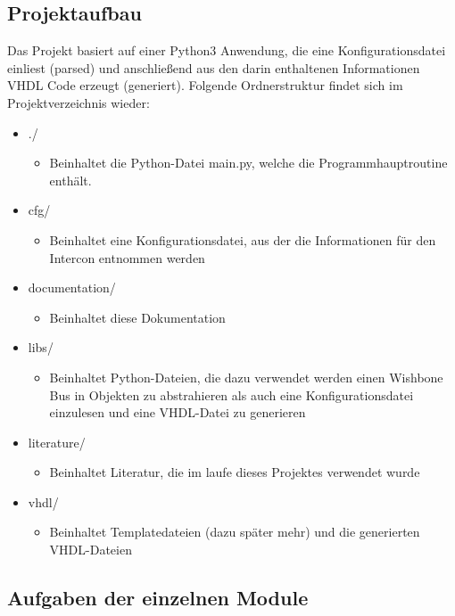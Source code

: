 \documentclass{article}
\begin{document}
\subsection{Projektaufbau}
Das Projekt basiert auf einer Python3 Anwendung, die eine Konfigurationsdatei einliest (parsed) und anschließend aus den darin enthaltenen Informationen VHDL Code erzeugt (generiert).
Folgende Ordnerstruktur findet sich im Projektverzeichnis wieder:
\begin{itemize}
\item ./
\begin{itemize}
\item Beinhaltet die Python-Datei main.py, welche die Programmhauptroutine enthält.
\end{itemize}
\item cfg/
\begin{itemize}
\item Beinhaltet eine Konfigurationsdatei, aus der die Informationen für den Intercon entnommen werden
\end{itemize}
\item documentation/
\begin{itemize}
\item Beinhaltet diese Dokumentation
\end{itemize}
\item libs/
\begin{itemize}
\item Beinhaltet Python-Dateien, die dazu verwendet werden einen Wishbone Bus in Objekten zu abstrahieren als auch eine Konfigurationsdatei einzulesen und eine VHDL-Datei zu generieren
\end{itemize}
\item literature/
\begin{itemize}
\item Beinhaltet Literatur, die im laufe dieses Projektes verwendet wurde
\end{itemize}
\item vhdl/
\begin{itemize}
\item Beinhaltet Templatedateien (dazu später mehr) und die generierten VHDL-Dateien
\end{itemize}
\end{itemize}
\subsection{Aufgaben der einzelnen Module}
\end{document}
